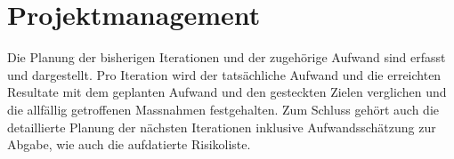 \section{Projektmanagement}
Die Planung der bisherigen Iterationen und der zugehörige Aufwand sind erfasst und dargestellt. Pro Iteration wird der tatsächliche Aufwand und die erreichten Resultate mit dem geplanten Aufwand und den gesteckten Zielen verglichen und die allfällig getroffenen Massnahmen 
festgehalten. Zum Schluss gehört auch die detaillierte Planung der nächsten Iterationen inklusive Aufwandsschätzung zur Abgabe, wie auch die aufdatierte Risikoliste.